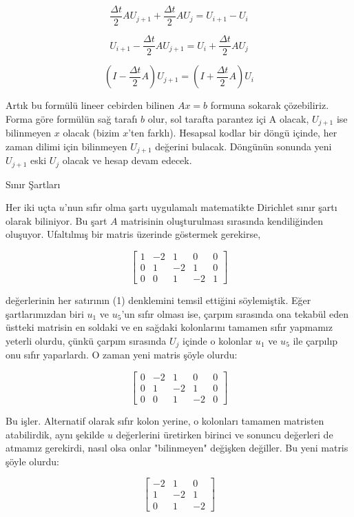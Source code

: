 \documentclass[12pt,fleqn]{article}\usepackage{../../common}
\begin{document}
$$ \frac{\Delta t}{2}AU_{j+1} + \frac{\Delta t}{2}AU_j = U_{i+1} - U_i  $$

$$ U_{i+1} - \frac{\Delta t}{2}AU_{j+1} = U_i + \frac{\Delta t}{2}AU_j  $$

$$ (I - \frac{\Delta t}{2}A) U_{j+1} = (I + \frac{\Delta t}{2}A)U_i $$

Artık bu formülü lineer cebirden bilinen $Ax=b$ formuna sokarak
çözebiliriz. Forma göre formülün sağ tarafı $b$ olur, sol tarafta parantez içi A
olacak, $U_{j+1}$ ise bilinmeyen $x$ olacak (bizim $x$'ten farklı). Hesapsal
kodlar bir döngü içinde, her zaman dilimi için bilinmeyen $U_{j+1}$ değerini
bulacak. Döngünün sonunda yeni $U_{j+1}$ eski $U_j$ olacak ve hesap devam
edecek. 

Sınır Şartları

Her iki uçta $u$'nun sıfır olma şartı uygulamalı matematikte Dirichlet sınır
şartı olarak biliniyor. Bu şart $A$ matrisinin oluşturulması sırasında
kendiliğinden oluşuyor. Ufaltılmış bir matris üzerinde göstermek gerekirse, 

$$ \left[ \begin{array}{ccccc}
1 & -2 & 1 & 0 & 0 \\
0 & 1 & -2 & 1 & 0 \\
0 & 0 & 1 & -2 & 1
\end{array} \right]
 $$

değerlerinin her satırının (1) denklemini temsil ettiğini söylemiştik.
Eğer şartlarımızdan biri $u_1$ ve $u_5$'un sıfır olması ise, çarpım
sırasında ona tekabül eden üstteki matrisin en soldaki ve en sağdaki
kolonlarını tamamen sıfır yapmamız yeterli olurdu, çünkü çarpım sırasında
$U_j$ içinde o kolonlar $u_1$ ve $u_5$ ile çarpılıp onu sıfır
yaparlardı. O zaman yeni matris şöyle olurdu:

$$ 
\left[ \begin{array}{ccccc}
0 & -2 & 1 & 0 & 0 \\
0 & 1 & -2 & 1 & 0 \\
0 & 0 & 1 & -2 & 0
\end{array} \right]
 $$

Bu işler. Alternatif olarak sıfır kolon yerine, o kolonları tamamen matristen
atabilirdik, aynı şekilde $u$ değerlerini üretirken birinci ve sonuncu değerleri
de atmamız gerekirdi, nasıl olsa onlar "bilinmeyen" değişken değiller. Bu yeni
matris şöyle olurdu:

$$ \left[ \begin{array}{ccc}
-2 & 1 & 0  \\
1 & -2 & 1  \\
0 & 1 & -2 
\end{array} \right]
$$
\end{document}
